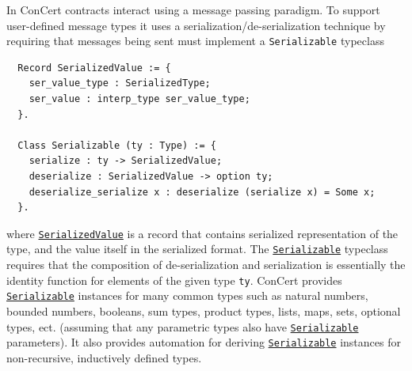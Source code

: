 \documentclass[twoside,11pt,openright]{report}
\newenvironment{code}{\captionsetup{type=figure, singlelinecheck=off, justification=raggedleft}}{}
\newcommand{\cc}{ConCert}
\newcommand{\coq}[1]{\texttt{#1}}
\begin{document}
In \cc{} contracts interact using a message passing paradigm. To support user-defined message types it uses a serialization/de-serialization technique by requiring that messages being sent must implement a \coq{Serializable} typeclass
\begin{code}
\label{def:SerializedValue-Serializable}
\begin{verbatim}
  Record SerializedValue := {
    ser_value_type : SerializedType;
    ser_value : interp_type ser_value_type;
  }.
  
  Class Serializable (ty : Type) := {
    serialize : ty -> SerializedValue;
    deserialize : SerializedValue -> option ty;
    deserialize_serialize x : deserialize (serialize x) = Some x;
  }.
\end{verbatim}
\end{code}
\newcommand{\serializable}{\hyperref[def:SerializedValue-Serializable]{\coq{Serializable}}}
\newcommand{\serializedValue}{\hyperref[def:SerializedValue-Serializable]{\coq{SerializedValue}}}
where \serializedValue{} is a record that contains serialized representation of the type, and the value itself in the serialized format. The \serializable{} typeclass requires that the composition of de-serialization and serialization  is essentially the identity function for elements of the given type \coq{ty}. \cc{} provides \serializable{} instances for many common types such as natural numbers, bounded numbers, booleans, sum types, product types, lists, maps, sets, optional types, ect. (assuming that any parametric types also have \serializable{} parameters). It also provides automation for deriving \serializable{} instances for non-recursive, inductively defined types.
\end{document}
